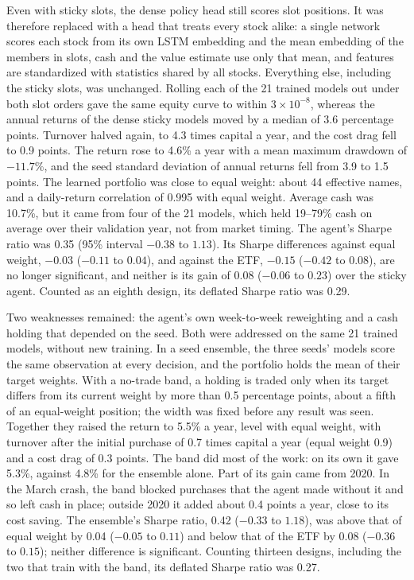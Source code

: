 Even with sticky slots, the dense policy head still scores slot positions. It was therefore replaced
with a head that treats every stock alike: a single network scores each stock from its own LSTM
embedding and the mean embedding of the members in slots, cash and the value estimate use only that
mean, and features are standardized with statistics shared by all stocks. Everything else, including
the sticky slots, was unchanged. Rolling each of the 21 trained models out under both slot orders gave
the same equity curve to within $3\times10^{-8}$, whereas the annual returns of the dense sticky
models moved by a median of 3.6 percentage points. Turnover halved again, to 4.3 times capital a year,
and the cost drag fell to 0.9 points. The return rose to 4.6\% a year with a mean maximum drawdown of
$-11.7\%$, and the seed standard deviation of annual returns fell from 3.9 to 1.5 points. The learned
portfolio was close to equal weight: about 44 effective names, and a daily-return correlation of 0.995
with equal weight. Average cash was 10.7\%, but it came from four of the 21 models, which held 19--79\%
cash on average over their validation year, not from market timing. The agent's Sharpe ratio was 0.35
(95\% interval $-0.38$ to $1.13$). Its Sharpe differences against equal weight, $-0.03$ ($-0.11$ to
$0.04$), and against the ETF, $-0.15$ ($-0.42$ to $0.08$), are no longer significant, and neither is its
gain of 0.08 ($-0.06$ to $0.23$) over the sticky agent. Counted as an eighth design, its deflated Sharpe
ratio was 0.29.

Two weaknesses remained: the agent's own week-to-week reweighting and a cash holding that depended on
the seed. Both were addressed on the same 21 trained models, without new training. In a seed ensemble,
the three seeds' models score the same observation at every decision, and the portfolio holds the mean
of their target weights. With a no-trade band, a holding is traded only when its target differs from
its current weight by more than 0.5 percentage points, about a fifth of an equal-weight position; the
width was fixed before any result was seen. Together they raised the return to 5.5\% a year, level with
equal weight, with turnover after the initial purchase of 0.7 times capital a year (equal weight 0.9)
and a cost drag of 0.3 points. The band did most of the work: on its own it gave 5.3\%, against 4.8\% for
the ensemble alone. Part of its gain came from 2020. In the March crash, the band blocked purchases that
the agent made without it and so left cash in place; outside 2020 it added about 0.4 points a year,
close to its cost saving. The ensemble's Sharpe ratio, 0.42 ($-0.33$ to $1.18$), was above that of equal
weight by 0.04 ($-0.05$ to $0.11$) and below that of the ETF by 0.08 ($-0.36$ to $0.15$); neither
difference is significant. Counting thirteen designs, including the two that train with the band, its
deflated Sharpe ratio was 0.27.

